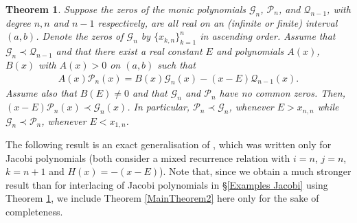 \documentclass[final,3p,times,12pt]{elsarticle}
\newtheorem{theorem}{Theorem}[section]
\numberwithin{equation}{section}  %
\begin{document}
\begin{theorem}\label{MainTheorem2*}
	Suppose the zeros of the monic polynomials $\mathcal{G}_{n}$, $\mathcal{P}_n$, and $\mathcal{Q}_{n-1}$, with degree $n,n$ and $n-1$ respectively, are all real on an (infinite or finite) interval $(a,b)$. Denote the zeros of $\mathcal{G}_{n}$ by $\{x_{k,n}\}_{k=1}^{n}$ in ascending order. Assume that $\mathcal{G}_n\prec \mathcal {Q}_{n-1}$
	and that there exist a real constant $E$ and polynomials $A(x)$, $B(x)$ with $A(x)>0$ on $(a,b)$ such that
	\begin{align}\label{GeneralMixedTTRR2*}
		A(x)\mathcal{P}_{n}(x) = B(x)\mathcal{G}_{n}(x) - (x-E)\mathcal{Q}_{n-1}(x).
	\end{align}
	Assume also that $B(E) \neq 0$ and that $\mathcal{G}_{n}$ and $\mathcal{P}_{n}$ have no common zeros.	Then, $(x-E)\mathcal{P}_n(x) \prec \mathcal{G}_n(x)$. In particular, $\mathcal{P}_n\prec \mathcal{G}_n$, whenever $E > x_{n,n}$ while $\mathcal{G}_n \prec \mathcal{P}_n$, whenever $E < x_{1,n}$.
\end{theorem}

The following result is an exact generalisation of \cite[Theorem~3]{Arvesu-Driver-Littlejohn-RamanujanJ-2023}, which was written only for Jacobi polynomials (both consider a mixed recurrence relation with $i=n$, $j=n$, $k=n+1$ and $H(x)=-(x-E)$). Note that, since we obtain a much stronger result than \cite[Theorem~3]{Arvesu-Driver-Littlejohn-RamanujanJ-2023} for interlacing of Jacobi polynomials in \S \ref{Examples Jacobi} using Theorem \ref{MainTheorem2*}, we include Theorem \ref{MainTheorem2} here only for the sake of completeness.  %
\end{document}
